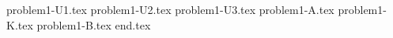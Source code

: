 \documentclass{../../../../style/mkimain}
\begin{document}
{problem1-U1.tex}
\newpage
{problem1-U2.tex}
{problem1-U3.tex}
{problem1-A.tex}
{problem1-K.tex}
{problem1-B.tex}
{end.tex}
\end{document}
